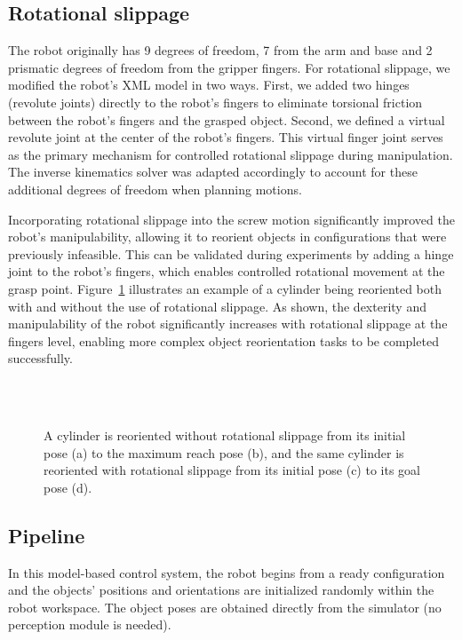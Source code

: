 \documentclass{article}
\begin{document}
\subsection{Rotational slippage}
The robot originally has 9 degrees of freedom, 7 from the arm and base and 2 prismatic degrees of freedom from the gripper fingers.
For rotational slippage, we modified the robot's XML model in two ways. First, we added two hinges (revolute joints) directly to the robot's fingers to eliminate torsional friction between the robot's fingers and the grasped object. Second, we defined a virtual revolute joint at the center of the robot's fingers. This virtual finger joint serves as the primary mechanism for controlled rotational slippage during manipulation. The inverse kinematics solver was adapted accordingly to account for these additional degrees of freedom when planning motions.

Incorporating rotational slippage into the screw motion significantly improved the robot's manipulability, allowing it to reorient objects in configurations that were previously infeasible. This can be validated during experiments by adding a hinge joint to the robot's fingers, which enables controlled rotational movement at the grasp point. Figure~\ref{Fig:Rotational_slippage} illustrates an example of a cylinder being reoriented both with and without the use of rotational slippage. As shown, the dexterity and manipulability of the robot significantly increases with rotational slippage at the fingers level, enabling more complex object reorientation tasks to be completed successfully.

\begin{figure}[!htbp]
\centering
     \quad \,
     \\
     \quad \,
    \caption{A cylinder is reoriented without rotational slippage from its initial pose (a) to the maximum reach pose (b), and the same cylinder is reoriented with rotational slippage from its initial pose (c) to its goal pose (d).}
\label{Fig:Rotational_slippage}
\end{figure}

\subsection{Pipeline}
In this model-based control system, the robot begins from a ready configuration and the objects' positions and orientations are initialized randomly within the robot workspace. The object poses are obtained directly from the simulator (no perception module is needed).
\end{document}
